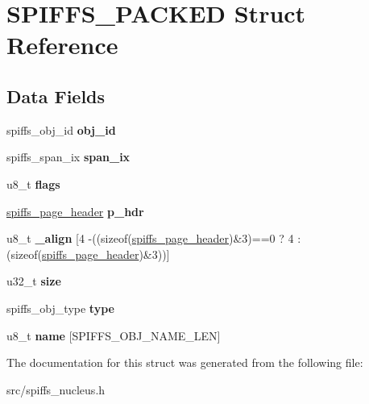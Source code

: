 \hypertarget{struct_s_p_i_f_f_s___p_a_c_k_e_d}{}\section{S\+P\+I\+F\+F\+S\+\_\+\+P\+A\+C\+K\+ED Struct Reference}
\label{struct_s_p_i_f_f_s___p_a_c_k_e_d}
\subsection*{Data Fields}
\begin{DoxyCompactItemize}
\item 
\mbox{\label{struct_s_p_i_f_f_s___p_a_c_k_e_d_a610766bf067526f5e600cde282107595}} 
spiffs\+\_\+obj\+\_\+id {\bfseries obj\+\_\+id}
\item 
\mbox{\label{struct_s_p_i_f_f_s___p_a_c_k_e_d_ad2b494d63964b70b86c66a27eec1e208}} 
spiffs\+\_\+span\+\_\+ix {\bfseries span\+\_\+ix}
\item 
\mbox{\label{struct_s_p_i_f_f_s___p_a_c_k_e_d_a31b830ab36a015849ca211145e2c7ffe}} 
u8\+\_\+t {\bfseries flags}
\item 
\mbox{\label{struct_s_p_i_f_f_s___p_a_c_k_e_d_a57781310180db784f3476def6f7506b7}} 
\mbox{\hyperlink{struct_s_p_i_f_f_s___p_a_c_k_e_d}{spiffs\+\_\+page\+\_\+header}} {\bfseries p\+\_\+hdr}
\item 
\mbox{\label{struct_s_p_i_f_f_s___p_a_c_k_e_d_a8b303b250d800a524a9ff51787951f13}} 
u8\+\_\+t {\bfseries \+\_\+align} \mbox{[}4 -\/((sizeof(\mbox{\hyperlink{struct_s_p_i_f_f_s___p_a_c_k_e_d}{spiffs\+\_\+page\+\_\+header}})\&3)==0 ? 4 \+:(sizeof(\mbox{\hyperlink{struct_s_p_i_f_f_s___p_a_c_k_e_d}{spiffs\+\_\+page\+\_\+header}})\&3))\mbox{]}
\item 
\mbox{\label{struct_s_p_i_f_f_s___p_a_c_k_e_d_aea58187be56f0bb3471c0e7e1c7ba6d5}} 
u32\+\_\+t {\bfseries size}
\item 
\mbox{\label{struct_s_p_i_f_f_s___p_a_c_k_e_d_a200b626db130ce8dc2a3c64f13063a98}} 
spiffs\+\_\+obj\+\_\+type {\bfseries type}
\item 
\mbox{\label{struct_s_p_i_f_f_s___p_a_c_k_e_d_a3072e1f0b4bf4fd48e546c0a91986cdc}} 
u8\+\_\+t {\bfseries name} \mbox{[}S\+P\+I\+F\+F\+S\+\_\+\+O\+B\+J\+\_\+\+N\+A\+M\+E\+\_\+\+L\+EN\mbox{]}
\end{DoxyCompactItemize}


The documentation for this struct was generated from the following file\+:\begin{DoxyCompactItemize}
\item 
src/spiffs\+\_\+nucleus.\+h\end{DoxyCompactItemize}
